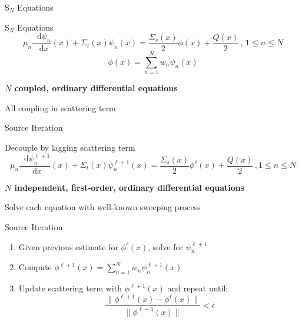\documentclass[10pt]{beamer}
\newcommand{\SN}{S$_N$\xspace}
\newcommand{\ud}{\mathop{}\!\mathrm{d}} %
\newcommand{\dderiv}[2]{\frac{\ud #1}{\ud #2}}
\begin{document}
\begin{frame}{\SN Equations}

	\begin{block}{\SN Equations}
	\begin{equation*}
		\mu_n \dderiv{\psi_n}{x}(x) + \Sigma_t(x) \psi_n(x) = 
		\frac{\Sigma_s(x)}{2} \phi(x) + \frac{Q(x)}{2} \,, \, 1 \leq n \leq N
	\end{equation*}
	\begin{equation*}
		\phi(x) = \sum_{n=1}^N w_n \psi_n(x)
	\end{equation*}
	\end{block}

	\textbf{$N$ coupled, ordinary differential equations}

	All coupling in scattering term 

\end{frame}

\begin{frame}{Source Iteration}

	Decouple by lagging scattering term 
	\begin{equation*}
		\mu_n \dderiv{\psi_n^{\ell+1}}{x}(x) + \Sigma_t(x) \psi_n^{\ell+1}(x) = 
		\frac{\Sigma_s(x)}{2} \phi^{\ell}(x) + \frac{Q(x)}{2} \,, 1 \leq n \leq N        
	\end{equation*}

	\textbf{$N$ independent, first-order, ordinary differential equations}

	Solve each equation with well-known sweeping process 

	\begin{exampleblock}{Source Iteration}
	\begin{enumerate}
		\item Given previous estimate for $\phi^{\ell}(x)$, solve for $\psi_n^{\ell+1}$

		\item Compute $\phi^{\ell+1}(x) = 
			\sum_{n=1}^N w_n \psi_n^{\ell+1}(x)$ 

		\item Update scattering term with $\phi^{\ell+1}(x)$ and repeat until: 
			 \begin{equation*}
				\frac{\|\phi^{\ell+1}(x) - \phi^{\ell}(x)\|}{\|\phi^{\ell+1}(x)\|} < \epsilon 
			 \end{equation*}

	\end{enumerate}
	\end{exampleblock}

\end{frame}
\end{document}
